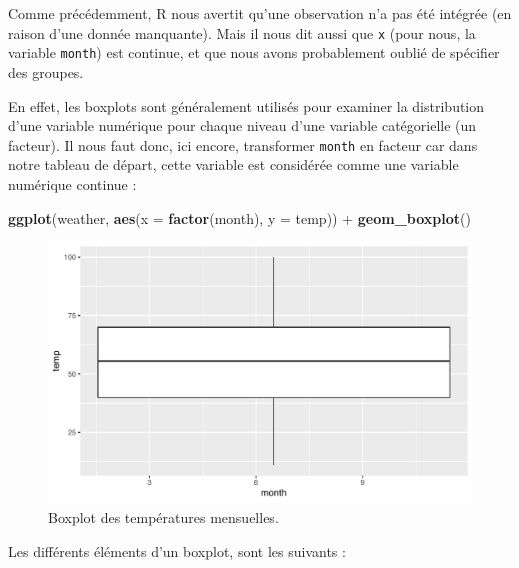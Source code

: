 \documentclass[a4paperpaper,]{article}
\newenvironment{Shaded}{\begin{snugshade}}{\end{snugshade}}
\newcommand{\DataTypeTok}[1]{\textcolor[rgb]{0.00,0.34,0.68}{#1}}
\newcommand{\KeywordTok}[1]{\textcolor[rgb]{0.12,0.11,0.11}{\textbf{#1}}}
\newcommand{\NormalTok}[1]{\textcolor[rgb]{0.12,0.11,0.11}{#1}}
\newcommand{\OperatorTok}[1]{\textcolor[rgb]{0.12,0.11,0.11}{#1}}
\newcommand{\StringTok}[1]{\textcolor[rgb]{0.75,0.01,0.01}{#1}}
\begin{document}
Comme précédemment, R nous avertit qu'une observation n'a pas été intégrée (en raison d'une donnée manquante). Mais il nous dit aussi que \texttt{x} (pour nous, la variable \texttt{month}) est continue, et que nous avons probablement oublié de spécifier des groupes.

En effet, les boxplots sont généralement utilisés pour examiner la distribution d'une variable numérique pour chaque niveau d'une variable catégorielle (un facteur). Il nous faut donc, ici encore, transformer \texttt{month} en facteur car dans notre tableau de départ, cette variable est considérée comme une variable numérique continue :

\begin{Shaded}
\begin{Highlighting}[]
\KeywordTok{ggplot}\NormalTok{(weather, }\KeywordTok{aes}\NormalTok{(}\DataTypeTok{x =} \KeywordTok{factor}\NormalTok{(month), }\DataTypeTok{y =}\NormalTok{ temp)) }\OperatorTok{+}
\StringTok{  }\KeywordTok{geom_boxplot}\NormalTok{()}
\end{Highlighting}
\end{Shaded}

\begin{figure}[htpb]

{\centering \includegraphics[width=0.9\linewidth]{figure/unnamed-chunk-54-1} 

}

\caption{Boxplot des températures mensuelles.}\label{fig:unnamed-chunk-54}
\end{figure}

Les différents éléments d'un boxplot, sont les suivants :
\end{document}
